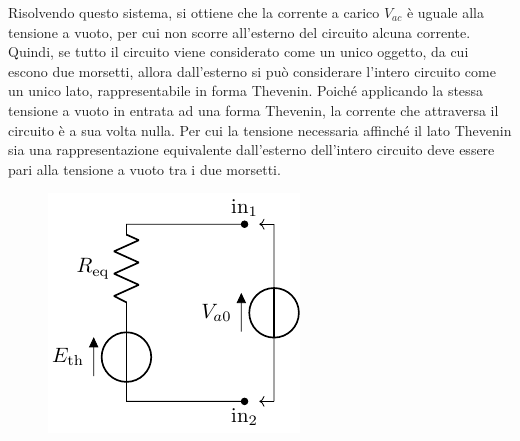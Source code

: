 \documentclass{article}
\numberwithin{equation}{subsection}
\begin{document}
Risolvendo questo sistema, si ottiene che la corrente a carico $V_{ac}$ è uguale alla tensione a vuoto, per cui non scorre all'esterno del circuito alcuna corrente. Quindi, 
se tutto il circuito viene 
considerato come un unico oggetto, da cui escono due morsetti, allora dall'esterno si può considerare l'intero circuito come un unico lato, rappresentabile in forma 
Thevenin. Poiché applicando la stessa tensione a vuoto in entrata ad una forma Thevenin, la corrente che attraversa il circuito è a sua volta nulla. Per cui la tensione 
necessaria affinché il lato Thevenin sia una rappresentazione equivalente dall'esterno dell'intero circuito deve essere pari alla tensione a vuoto tra i due morsetti. 
\begin{figure}[H]%
    \centering
    \includegraphics{rappresentazione-thevenin-circuito-8.pdf}%
    \label{fig:rappresentazione-thevenin-circuito-8}
\end{figure}
\end{document}
